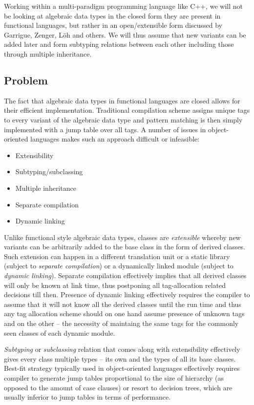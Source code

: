 \documentclass[preprint]{sigplanconf}
\begin{document}
Working within a multi-paradigm programming language like C++, we will not be 
looking at algebraic data types in the closed form they are present in 
functional languages, but rather in an open/extensible form discussed by 
Garrigue\cite{garrigue-98}, Zenger\cite{Zenger:2001}, L\"oh\cite{LohHinze2006} 
and others. We will thus assume that new variants can be added later and form 
subtyping relations between each other including those through multiple 
inheritance.

\subsection{Problem}

The fact that algebraic data types in functional languages are closed allows for 
their efficient implementation. Traditional compilation scheme assigns unique 
tags to every variant of the algebraic data type and pattern matching is then 
simply implemented with a jump table over all tags. A number of issues in 
object-oriented languages makes such an approach difficult or infeasible:

\begin{itemize}
\item Extensibility
\item Subtyping/subclassing
\item Multiple inheritance
\item Separate compilation
\item Dynamic linking 
\end{itemize}

Unlike functional style algebraic data types, classes are \emph{extensible} 
whereby new variants can be arbitrarily added to the base class in the form of 
derived classes. Such extension can happen in a different translation unit or a
static library (subject to \emph{separate compilation}) or a dynamically linked 
module (subject to \emph{dynamic linking}). Separate compilation effectively 
implies that all derived classes will only be known at link time, thus 
postponing all tag-allocation related decisions till then. Presence of dynamic 
linking effectively requires the compiler to assume that it will not know all 
the derived classes until the run time and thus any tag allocation scheme should
on one hand assume presence of unknown tags and on the other -- the necessity of 
maintaing the same tags for the commonly seen classes of each dynamic module. 

\emph{Subtyping} or \emph{subclassing} relation that comes along with 
extensibility effectively gives every class multiple types -- its own and the 
types of all its base classes. Best-fit strategy typically used in 
object-oriented languages effectively requires compiler to generate jump tables 
proportional to the size of hierarchy (as opposed to the amount of case clauses) 
or resort to decision trees, which are usually inferior to jump tables in terms 
of performance.
\end{document}
